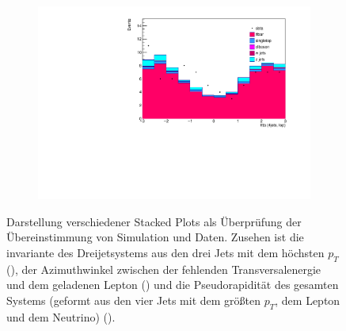 \begin{figure}
\begin{subfigure}{0.5\textwidth}
    \includegraphics[width=\linewidth]{plots_and_txt/stacked_plots/stacked_fulleta.pdf}
    \caption{}
    \label{fig:stacked_fulleta}
  \end{subfigure}%
  \caption{Darstellung verschiedener Stacked Plots als Überprüfung der Übereinstimmung von Simulation und Daten.
  Zusehen ist die invariante des Dreijetsystems aus den drei Jets mit dem höchsten $p_T$ (),  
  der Azimuthwinkel zwischen der fehlenden Transversalenergie und dem geladenen 
  Lepton () und die Pseudorapidität des gesamten Systems (geformt aus den vier Jets mit dem größten $p_T$, dem Lepton und dem 
  Neutrino) ().
  }
  \label{fig:stacked_Distributions4}
\end{figure}












